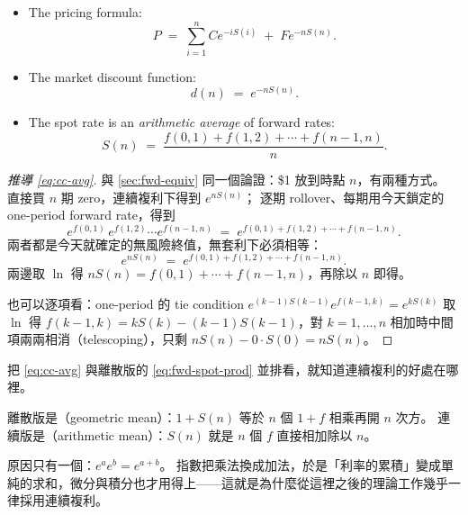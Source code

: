 \begin{itemize}[itemsep=0.35em]
	\item The pricing formula:
	      \begin{equation}
		      P \;=\; \sum_{i=1}^{n} C e^{-iS(i)} \;+\; F e^{-nS(n)} . \label{eq:cc-price}
	      \end{equation}
	\item The market discount function:
	      \begin{equation}
		      d(n) \;=\; e^{-nS(n)} . \label{eq:cc-df}
	      \end{equation}
	\item The spot rate is an \emph{arithmetic average} of forward rates:
	      \begin{equation}
		      S(n) \;=\; \frac{f(0,1)+f(1,2)+\cdots+f(n-1,n)}{n} . \label{eq:cc-avg}
	      \end{equation}
\end{itemize}

\suppstart
\begin{proof}[推導 \eqref{eq:cc-avg}]
	與 \autoref{sec:fwd-equiv} 同一個論證：\$1 放到時點 $n$，有兩種方式。
	直接買 $n$ 期 zero，連續複利下得到 $e^{nS(n)}$；
	逐期 rollover、每期用今天鎖定的 one-period forward rate，得到
	\[
		e^{f(0,1)}\,e^{f(1,2)}\cdots e^{f(n-1,n)} \;=\; e^{f(0,1)+f(1,2)+\cdots+f(n-1,n)} .
	\]
	兩者都是今天就確定的無風險終值，無套利下必須相等：
	\[
		e^{nS(n)} \;=\; e^{f(0,1)+f(1,2)+\cdots+f(n-1,n)} .
	\]
	兩邊取 $\ln$ 得 $nS(n)=f(0,1)+\cdots+f(n-1,n)$，再除以 $n$ 即得。

	也可以逐項看：one-period 的 tie condition $e^{(k-1)S(k-1)}e^{f(k-1,k)}=e^{kS(k)}$ 取 $\ln$ 得
	$f(k-1,k)=kS(k)-(k-1)S(k-1)$，對 $k=1,\ldots,n$ 相加時中間項兩兩相消（telescoping），只剩 $nS(n)-0\cdot S(0)=nS(n)$。
\end{proof}

\begin{remark}
	把 \eqref{eq:cc-avg} 與離散版的 \eqref{eq:fwd-spot-prod} 並排看，就知道連續複利的好處在哪裡。

	離散版是（geometric mean）：$1+S(n)$ 等於 $n$ 個 $1+f$ 相乘再開 $n$ 次方。
	連續版是（arithmetic mean）：$S(n)$ 就是 $n$ 個 $f$ 直接相加除以 $n$。

	原因只有一個：$e^{a}e^{b}=e^{a+b}$。
	指數把乘法換成加法，於是「利率的累積」變成單純的求和，微分與積分也才用得上——這就是為什麼從這裡之後的理論工作幾乎一律採用連續複利。
\end{remark}
\suppend


